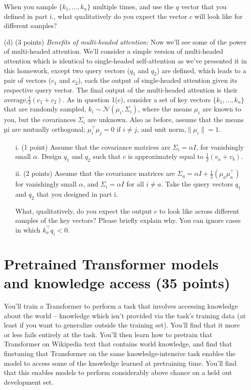 \documentclass[letterpaper,12pt]{article}
\begin{document}
\begin{itemize}
	When you sample $\{k_1, \ldots , k_n\}$ multiple times, and use the $q$ vector that you defined in part i., what qualitatively do you expect the vector $c$ will look like for different samples?

	\end{itemize}	
	
	\noindent (d) (3 points) \textit{Benefits of multi-headed attention:} Now we’ll see some of the power of multi-headed attention. We’ll consider a simple version of multi-headed attention which is identical to single-headed self-attention as we’ve presented it in this homework, except two query vectors ($q_1$ and $q_2$) are defined, which leads to a pair of vectors ($c_1$ and $c_2$), each the output of single-headed attention given its respective query vector. The final output of the multi-headed attention is their average,$\frac{1}{2}(c_1+c_2)$. As in question 1(c), consider a set of key vectors $\{k_1, \ldots , k_n\}$ that are randomly sampled, $k_i \sim \mathcal{N} (\mu_i, \Sigma_i)$, where the means $\mu_i$ are known to you, but the covariances $\Sigma_i$ are unknown. Also as before,	assume that the means µi are mutually orthogonal; $\mu^\top_i \mu_j = 0$ if $i \neq j$, and unit norm,$\|\mu_i\|= 1$.
	
	\begin{itemize}
	\item[i.] 
	(1 point) Assume that the covariance matrices are $\Sigma_i = \alpha I$, for vanishingly small $\alpha$. Design $q_1$
	and $q_2$ such that $c$ is approximately equal to $\frac{1}{2}(v_a + v_b)$.
	
	\item[ii.] 
	(2 points) Assume that the covariance matrices are $\Sigma_a = \alpha I + \frac{1}{2}(\mu_a \mu_a^\top)$ for vanishingly small $\alpha$, and $\Sigma_i = \alpha I$ for all $i \neq a$. Take the query vectors $q_1$ and $q_2$ that you designed in part i.
	
	What, qualitatively, do you expect the output $c$ to look like across different samples of the key
	vectors? Please briefly explain why. You can ignore cases in which $k^\top_a q_i < 0$.
	\end{itemize}	
	
	\section{Pretrained Transformer models and knowledge access (35 points)}
	
	\noindent You’ll train a Transformer to perform a task that involves accessing knowledge about the world – knowledge which isn’t provided via the task’s training data (at least if you want to generalize outside the training set). You’ll find that it more or less fails entirely at the task. You’ll then learn how to pretrain that Transformer on Wikipedia text that contains world knowledge, and find that finetuning that Transformer on the same knowledge-intensive task enables the model to access some of the knowledge learned at pretraining time. You’ll find that this enables models to perform considerably above chance on a held out development set.
	
\end{document}
